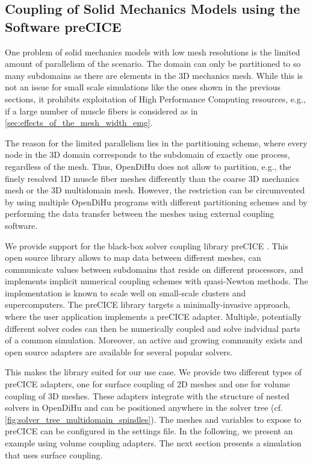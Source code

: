 \subsection{Coupling of Solid Mechanics Models using the Software preCICE}

One problem of solid mechanics models with low mesh resolutions is the limited amount of parallelism of the scenario. The domain can only be partitioned to so many subdomains as there are elements in the 3D mechanics mesh. While this is not an issue for small scale simulations like the ones shown in the previous sections, it prohibits exploitation of High Performance Computing resources, e.g., if a large number of muscle fibers is considered as in \cref{sec:effects_of_the_mesh_width_emg}.

The reason for the limited parallelism lies in the partitioning scheme, where every node in the 3D domain corresponds to the subdomain of exactly one process, regardless of the mesh. Thus, OpenDiHu does not allow to partition, e.g., the finely resolved 1D muscle fiber meshes differently than the coarse 3D mechanics mesh or the 3D multidomain mesh. However, the restriction can be circumvented by using multiple OpenDiHu programs with different partitioning schemes and by performing the data transfer between the meshes using external coupling software.

We provide support for the black-box solver coupling library preCICE \cite{precice}. This open source library allows to map data between different meshes, can communicate values between subdomains that reside on different processors, and implements implicit numerical coupling schemes with quasi-Newton methods. The implementation is known to scale well on small-scale clusters and supercomputers.
The preCICE library targets a minimally-invasive approach, where the user application implements a preCICE adapter. Multiple, potentially different solver codes can then be numerically coupled and solve indvidual parts of a common simulation. Moreover, an active and growing community exists and open source adapters are available for several popular solvers. 

This makes the library suited for our use case. We provide two different types of preCICE adapters, one for surface coupling of 2D meshes and one for volume coupling of 3D meshes. These adapters integrate with the structure of nested solvers in OpenDiHu and can be positioned anywhere in the solver tree (cf. \cref{fig:solver_tree_multidomain_spindles}). The meshes and variables to expose to preCICE can be configured in the settings file.
In the following, we present an example using volume coupling adapters. The next section presents a simulation that uses surface coupling.

